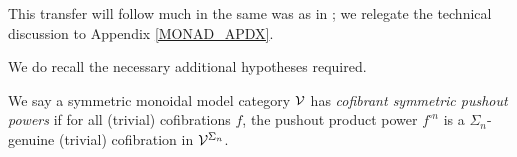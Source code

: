 \documentclass[a4paper,10pt
,draft
]{article}%
\renewcommand{\1}{\eta}%
\newcommand{\SC}{\Sigma_{\mathfrak C}}
\begin{document}
This transfer will follow much in the same was as in \cite{BP_geo};
we relegate the technical discussion to Appendix \ref{MONAD_APDX}.

We do recall the necessary additional hypotheses required.

\begin{definition}
      \label{CSPP_DEF}
      We say a symmetric monoidal model category $\mathcal V$ has \textit{cofibrant symmetric pushout powers} if
      for all (trivial) cofibrations $f$, the pushout product power $f^{\square n}$
      is a $\Sigma_n$-genuine (trivial) cofibration in $\mathcal V^{\Sigma_n}$. 
\end{definition}



      
\end{document}

